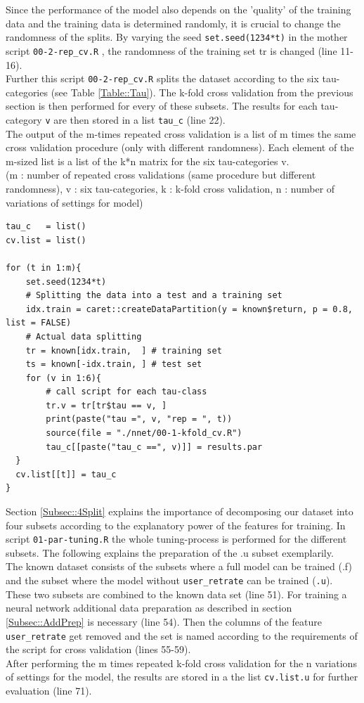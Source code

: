 \documentclass[a4paper,12pt]{article}
\begin{document}
Since the performance of the model also depends on the 'quality' of the training data and the training data is determined randomly, it is crucial to change the randomness of the splits. By varying the seed \texttt{set.seed(1234*t)} in the mother script  \texttt{00-2-rep\_cv.R} , the randomness of the training set tr is changed (line 11-16). \\ 
Further this script \texttt{00-2-rep\_cv.R} splits the dataset according to the six tau-categories (see Table \ref{Table::Tau}). The k-fold cross validation from the previous section is then performed for every of these subsets. The results for each tau-category \texttt{v} are then stored in a list \texttt{tau\_c} (line 22). \\
The output of the m-times repeated cross validation is a list of m times the same cross validation procedure (only with different randomness). Each element of the m-sized list is a list of the k*n matrix for the six tau-categories v.\\
(m : number of repeated cross validations (same procedure but different randomness), v : six tau-categories, k : k-fold cross validation, n : number of variations of settings for model)\\ 

\begin{lstlisting}
tau_c   = list()
cv.list = list()

for (t in 1:m){
    set.seed(1234*t)
    # Splitting the data into a test and a training set 
    idx.train = caret::createDataPartition(y = known$return, p = 0.8, list = FALSE)
    # Actual data splitting
    tr = known[idx.train,  ] # training set
    ts = known[-idx.train, ] # test set
    for (v in 1:6){
        # call script for each tau-class
        tr.v = tr[tr$tau == v, ]
        print(paste("tau =", v, "rep = ", t))
        source(file = "./nnet/00-1-kfold_cv.R")
        tau_c[[paste("tau_c ==", v)]] = results.par
  }
  cv.list[[t]] = tau_c
}
\end{lstlisting}



Section \ref{Subsec::4Split} explains the importance of decomposing our dataset into four subsets according to the explanatory power of the features for training. In script \texttt{01-par-tuning.R} the whole tuning-process is performed for the different subsets. The following explains the preparation of the .u subset exemplarily.\\
The known dataset consists of the subsets where a full model can be trained (.f) and the subset where the model without \texttt{user\_retrate} can be trained (\texttt{.u}). These two subsets are combined to the known data set (line 51). For training a neural network additional data preparation as described in section \ref{Subsec::AddPrep} is necessary (line 54). Then the columns of the feature \texttt{user\_retrate} get removed and the set is named according to the requirements of the script for cross validation (lines 55-59). \\
After performing the m times repeated k-fold cross validation for the n variations of settings for the model, the results are stored in a the list \texttt{cv.list.u} for further evaluation (line 71).
\end{document}
